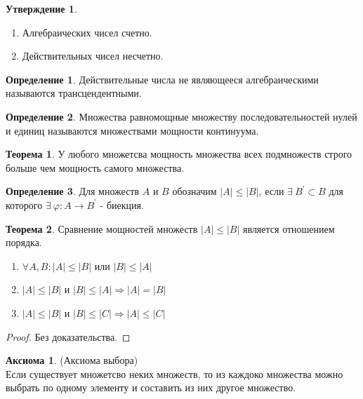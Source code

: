 \documentclass[a4paper, 12pt]{article}
\renewcommand{\phi}{\varphi}
\newcommand\tab[1][.5cm]{\hspace*{#1}}
\theoremstyle{definition}
\newtheorem*{definition}{Определение}
\newtheorem*{theorem}{Теорема}
\newtheorem*{statement}{Утверждение}
\newtheorem*{axiom}{Аксиома}
\begin{document}
        \begin{statement}
            \begin{enumerate}\tab
                \item Алгебраических чисел счетно.
                \item Действительных чисел несчетно.
            \end{enumerate}
        \end{statement}
        \begin{definition}
            Действительные числа не являющееся алгебраическими называются трансцендентными.
        \end{definition} 
        \begin{definition}
            Множества равномощные множеству последовательностей нулей и единиц называются множествами мощности континуума.
        \end{definition} 
        \begin{theorem}
            У любого множетсва мощность множества всех подмножеств строго больше чем мощность самого множества.
        \end{theorem}
        \begin{definition}
            Для множеств $A$ и $B$ обозначим $|A|\leq |B|$, если $\exists \ B^{\prime} \subset B$ для которого $\exists \ \phi:A\to B^{\prime}$ - биекция.
        \end{definition} 
        \begin{theorem}
            Сравнение мощностей множеств $|A|\leq |B|$ является отношением порядка.
            \begin{enumerate}
                \item $\forall A,B: |A|\leq |B|$ или $|B|\leq |A|$ 
                \item $|A|\leq |B|$ и $|B|\leq |A| \Rightarrow |A|=|B|$
                \item $|A|\leq |B|$ и $|B|\leq |C| \Rightarrow |A|\leq |C|$
            \end{enumerate}
        \end{theorem}
        \begin{proof}
            Без доказательства.
        \end{proof}
        \begin{axiom}(Аксиома выбора)\\
            Если существует множетсво неких множеств, то из каждоко множества можно выбрать по одному элементу и составить из них другое множество.
        \end{axiom}
\end{document}
